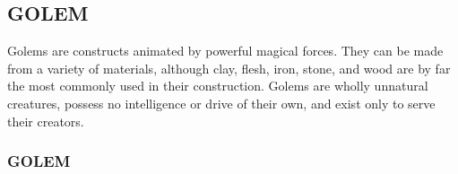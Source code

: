 \begin{multicols}{2}
\vspace{1em}

\subsection{GOLEM}

Golems are constructs animated by powerful magical forces. They can be made from a variety of materials, although clay, flesh, iron, stone, and wood are by far the most commonly used in their construction. Golems are wholly unnatural creatures, possess no intelligence or drive of their own, and exist only to serve their creators.

\end{multicols}

\noindent \begin{minipage}{\columnwidth}

\vspace{1em}

\subsubsection{GOLEM}


\end{minipage}
